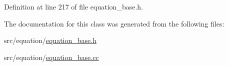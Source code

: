 Definition at line 217 of file equation\+\_\+base.\+h.



The documentation for this class was generated from the following files\+:\begin{DoxyCompactItemize}
\item 
src/equation/\hyperlink{equation__base_8h}{equation\+\_\+base.\+h}\item 
src/equation/\hyperlink{equation__base_8cc}{equation\+\_\+base.\+cc}\end{DoxyCompactItemize}
